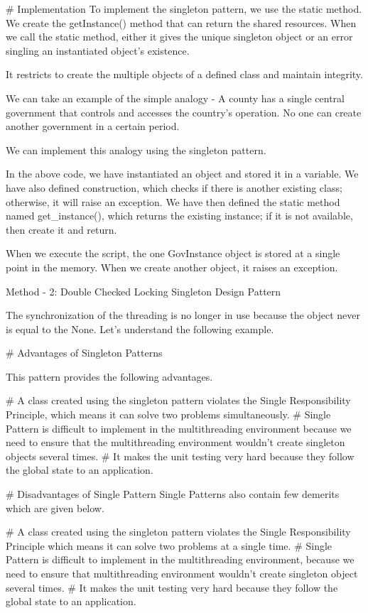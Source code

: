 # Implementation
To implement the singleton pattern, we use the static method. We create the getInstance() method that can return the shared resources. When we call the static method, either it gives the unique singleton object or an error singling an instantiated object's existence.

It restricts to create the multiple objects of a defined class and maintain integrity.

We can take an example of the simple analogy - A county has a single central government that controls and accesses the country's operation. No one can create another government in a certain period.

We can implement this analogy using the singleton pattern.


In the above code, we have instantiated an object and stored it in a variable. We have also defined construction, which checks if there is another existing class; otherwise, it will raise an exception. We have then defined the static method named get_instance(), which returns the existing instance; if it is not available, then create it and return.

When we execute the script, the one GovInstance object is stored at a single point in the memory. When we create another object, it raises an exception.

Method - 2: Double Checked Locking Singleton Design Pattern

The synchronization of the threading is no longer in use because the object never is equal to the None. Let's understand the following example.


# Advantages of Singleton Patterns


This pattern provides the following advantages.

# A class created using the singleton pattern violates the Single Responsibility Principle, which means it can solve two problems simultaneously.
 # Single Pattern is difficult to implement in the multithreading environment because we need to ensure that the multithreading environment wouldn't create singleton objects several times.
# It makes the unit testing very hard because they follow the global state to an application.


# Disadvantages of Single Pattern
Single Patterns also contain few demerits which are given below.

# A class created using the singleton pattern violates the Single Responsibility Principle which means it can solve two problems at a single time.
# Single Pattern is difficult to implement in the multithreading environment, because we need to ensure that multithreading environment wouldn't create singleton object several times.
# It makes the unit testing very hard because they follow the global state to an application.

